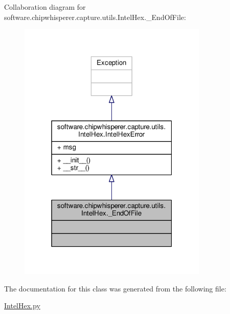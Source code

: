 Collaboration diagram for software.\+chipwhisperer.\+capture.\+utils.\+Intel\+Hex.\+\_\+\+End\+Of\+File\+:\nopagebreak
\begin{figure}[H]
\begin{center}
\leavevmode
\includegraphics[width=256pt]{da/d63/classsoftware_1_1chipwhisperer_1_1capture_1_1utils_1_1IntelHex_1_1__EndOfFile__coll__graph}
\end{center}
\end{figure}


The documentation for this class was generated from the following file\+:\begin{DoxyCompactItemize}
\item 
\hyperlink{IntelHex_8py}{Intel\+Hex.\+py}\end{DoxyCompactItemize}
